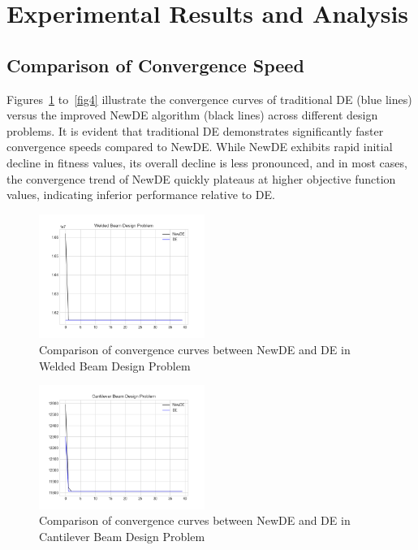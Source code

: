 \documentclass[conference]{IEEEtran}
\begin{document}
\section{Experimental Results and Analysis}

\subsection{Comparison of Convergence Speed}

Figures~\ref{fig1} to~\ref{fig4} illustrate the convergence curves of traditional DE (blue lines) versus the improved NewDE algorithm (black lines) across different design problems. It is evident that traditional DE demonstrates significantly faster convergence speeds compared to NewDE. While NewDE exhibits rapid initial decline in fitness values, its overall decline is less pronounced, and in most cases, the convergence trend of NewDE quickly plateaus at higher objective function values, indicating inferior performance relative to DE.

\begin{figure}[H]
    \centering
    \includegraphics[width=0.48\textwidth]{1Figure_1.png}
    \caption{Comparison of convergence curves between NewDE and DE in Welded Beam Design Problem}
    \label{fig1}
\end{figure}

\begin{figure}[H]
    \centering
    \includegraphics[width=0.48\textwidth]{2Figure_1.png}
    \caption{Comparison of convergence curves between NewDE and DE in Cantilever Beam Design Problem}
    \label{fig2}
\end{figure}
\end{document}
